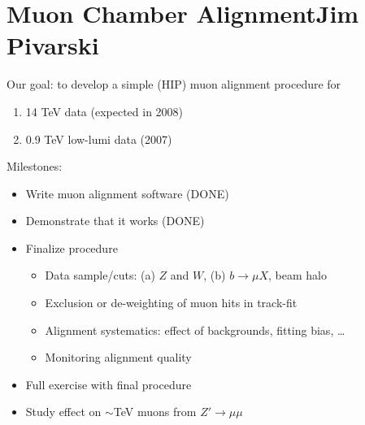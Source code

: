 \documentclass[compress]{beamer}
\begin{document}
\section*{\hspace{1.5 cm} Muon Chamber Alignment\hfill Jim Pivarski}

\begin{frame}
Our goal: to develop a simple (HIP) muon alignment procedure for
\begin{center}
\begin{minipage}{0.8\linewidth}
\begin{enumerate}
  \item 14 TeV data (expected in 2008)
  \item 0.9 TeV low-lumi data (2007)
\end{enumerate}
\end{minipage}
\end{center}

Milestones:
\begin{itemize}
  \item \textcolor{dkred}{Write muon alignment software (DONE)}
  \item \textcolor{dkred}{Demonstrate that it works (DONE)}
  \item Finalize procedure
  \begin{itemize}
    \item Data sample/cuts: \textcolor{dkblue}{(a)} $Z$ and $W$, \textcolor{dkblue}{(b)} $b\to\mu X$, beam halo
    \item Exclusion or de-weighting of muon hits in track-fit
    \item Alignment systematics: effect of backgrounds, fitting bias, \ldots
    \item Monitoring alignment quality
  \end{itemize}
  \item Full exercise with final procedure
  \item Study effect on $\sim$TeV muons from $Z'\to\mu\mu$
\end{itemize}
\end{frame}
\end{document}
